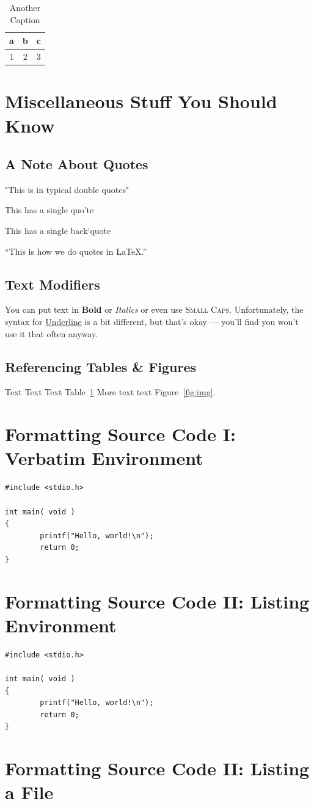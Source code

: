 \documentclass{article}
\begin{document}
\begin{table}[ht!]
\centering
\caption{Another Caption}
\label{tab:stuff}
\begin{tabular}{r|cl|}
\hline
a & b & c\\
\hline
1 & 2 & 3\\
\hline
\end{tabular}
\end{table}

\section{Miscellaneous Stuff You Should Know}
\subsection{A Note About Quotes}

"This is in typical double quotes"

This has a single quo'te

This has a single back`quote

``This is how we do quotes in \LaTeX.''

\subsection{Text Modifiers}

You can put text in \textbf{Bold} or \textit{Italics} or even use \textsc{Small
Caps}. Unfortunately, the syntax for \underline{Underline} is a bit different,
but that's okay --- you'll find you won't use it that often anyway.

\subsection{Referencing Tables \& Figures}

Text Text Text Table~\ref{tab:stuff} More text text Figure~\ref{fig:img}.

\appendix

\section{Formatting Source Code I: Verbatim Environment}
\begin{verbatim}
#include <stdio.h>

int main( void )
{
        printf("Hello, world!\n");
        return 0;
}
\end{verbatim}

\section{Formatting Source Code II: Listing Environment}
\begin{lstlisting}
#include <stdio.h>

int main( void )
{
        printf("Hello, world!\n");
        return 0;
}
\end{lstlisting}


\section{Formatting Source Code II: Listing a File}


\end{document}
